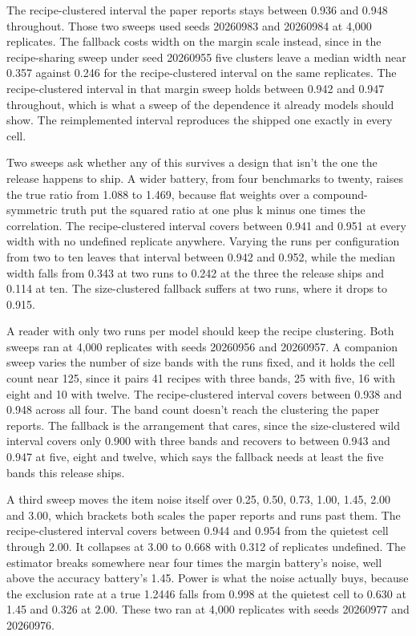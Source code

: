 The recipe-clustered interval the paper reports stays between 0.936 and 0.948 throughout. Those two sweeps used seeds 20260983 and 20260984 at 4,000 replicates. The fallback costs width on the margin scale instead, since in the recipe-sharing sweep under seed 20260955 five clusters leave a median width near 0.357 against 0.246 for the recipe-clustered interval on the same replicates. The recipe-clustered interval in that margin sweep holds between 0.942 and 0.947 throughout, which is what a sweep of the dependence it already models should show. The reimplemented interval reproduces the shipped one exactly in every cell.

Two sweeps ask whether any of this survives a design that isn't the one the release happens to ship. A wider battery, from four benchmarks to twenty, raises the true ratio from 1.088 to 1.469, because flat weights over a compound-symmetric truth put the squared ratio at one plus k minus one times the correlation. The recipe-clustered interval covers between 0.941 and 0.951 at every width with no undefined replicate anywhere. Varying the runs per configuration from two to ten leaves that interval between 0.942 and 0.952, while the median width falls from 0.343 at two runs to 0.242 at the three the release ships and 0.114 at ten. The size-clustered fallback suffers at two runs, where it drops to 0.915.

A reader with only two runs per model should keep the recipe clustering. Both sweeps ran at 4,000 replicates with seeds 20260956 and 20260957. A companion sweep varies the number of size bands with the runs fixed, and it holds the cell count near 125, since it pairs 41 recipes with three bands, 25 with five, 16 with eight and 10 with twelve. The recipe-clustered interval covers between 0.938 and 0.948 across all four. The band count doesn't reach the clustering the paper reports. The fallback is the arrangement that cares, since the size-clustered wild interval covers only 0.900 with three bands and recovers to between 0.943 and 0.947 at five, eight and twelve, which says the fallback needs at least the five bands this release ships.

A third sweep moves the item noise itself over 0.25, 0.50, 0.73, 1.00, 1.45, 2.00 and 3.00, which brackets both scales the paper reports and runs past them. The recipe-clustered interval covers between 0.944 and 0.954 from the quietest cell through 2.00. It collapses at 3.00 to 0.668 with 0.312 of replicates undefined. The estimator breaks somewhere near four times the margin battery's noise, well above the accuracy battery's 1.45. Power is what the noise actually buys, because the exclusion rate at a true 1.2446 falls from 0.998 at the quietest cell to 0.630 at 1.45 and 0.326 at 2.00. These two ran at 4,000 replicates with seeds 20260977 and 20260976.

